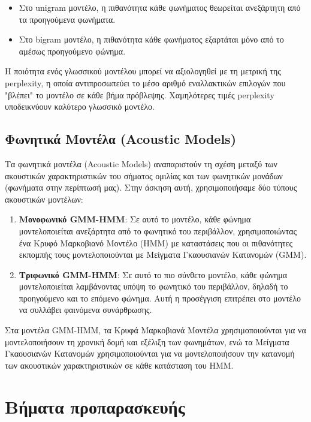 \documentclass[a4paper,12pt]{article}
\begin{document}
\begin{itemize}
    \item Στο unigram μοντέλο, η πιθανότητα κάθε φωνήματος θεωρείται ανεξάρτητη από τα προηγούμενα φωνήματα.
    \item Στο bigram μοντέλο, η πιθανότητα κάθε φωνήματος εξαρτάται μόνο από το αμέσως προηγούμενο φώνημα.
\end{itemize}

Η ποιότητα ενός γλωσσικού μοντέλου μπορεί να αξιολογηθεί με τη μετρική της perplexity, η οποία αντιπροσωπεύει το μέσο αριθμό εναλλακτικών επιλογών που "βλέπει" το μοντέλο σε κάθε βήμα πρόβλεψης. Χαμηλότερες τιμές perplexity υποδεικνύουν καλύτερο γλωσσικό μοντέλο.

\subsection{Φωνητικά Μοντέλα (Acoustic Models)}

Τα φωνητικά μοντέλα (Acoustic Models) αναπαριστούν τη σχέση μεταξύ των ακουστικών χαρακτηριστικών του σήματος ομιλίας και των φωνητικών μονάδων (φωνήματα στην περίπτωσή μας). Στην άσκηση αυτή, χρησιμοποιήσαμε δύο τύπους ακουστικών μοντέλων:

\begin{enumerate}
    \item \textbf{Μονοφωνικό GMM-HMM}: Σε αυτό το μοντέλο, κάθε φώνημα μοντελοποιείται ανεξάρτητα από το φωνητικό του περιβάλλον, χρησιμοποιώντας ένα Κρυφό Μαρκοβιανό Μοντέλο (HMM) με καταστάσεις που οι πιθανότητες εκπομπής τους μοντελοποιούνται με Μείγματα Γκαουσιανών Κατανομών (GMM).
    
    \item \textbf{Τριφωνικό GMM-HMM}: Σε αυτό το πιο σύνθετο μοντέλο, κάθε φώνημα μοντελοποιείται λαμβάνοντας υπόψη το φωνητικό του περιβάλλον, δηλαδή το προηγούμενο και το επόμενο φώνημα. Αυτή η προσέγγιση επιτρέπει στο μοντέλο να συλλάβει φαινόμενα συνάρθρωσης.
\end{enumerate}

Στα μοντέλα GMM-HMM, τα Κρυφά Μαρκοβιανά Μοντέλα χρησιμοποιούνται για να μοντελοποιήσουν τη χρονική δομή και εξέλιξη των φωνημάτων, ενώ τα Μείγματα Γκαουσιανών Κατανομών χρησιμοποιούνται για να μοντελοποιήσουν την κατανομή των ακουστικών χαρακτηριστικών σε κάθε κατάσταση του HMM.

\section*{Βήματα προπαρασκευής}
\end{document}
